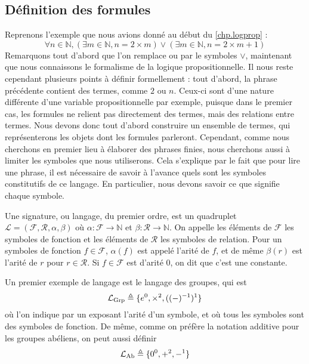 \subsection{Définition des formules}

Reprenons l'exemple que nous avions donné au début du \cref{chp.logprop} :
\[\forall n \in \mathbb N, (\exists m \in \mathbb N, n = 2\times m) \lor
(\exists m \in \mathbb N, n = 2 \times m + 1)\]
Remarquons tout d'abord que l'on remplace \og ou\fg{} par le symboles $\lor$,
maintenant que nous connaissons le formalisme de la logique propositionnelle.
Il nous reste cependant plusieurs points à définir formellement : tout d'abord,
la phrase précédente contient des termes, comme $2$ ou $n$. Ceux-ci sont d'une
nature différente d'une variable propositionnelle par exemple, puisque dans le
premier cas, les formules ne relient pas directement des termes, mais des
relations entre termes. Nous devons donc tout d'abord construire un ensemble de
termes, qui représenterons les objets dont les formules parleront. Cependant,
comme nous cherchons en premier lieu à élaborer des phrases finies, nous
cherchons aussi à limiter les symboles que nous utiliserons. Cela s'explique par
le fait que pour lire une phrase, il est nécessaire de savoir à l'avance quels
sont les symboles constitutifs de ce langage. En particulier, nous devons savoir
ce que signifie chaque symbole.

\begin{definition}[Signature]
  Une signature, ou langage, du premier ordre, est un quadruplet $\mathcal L =
  (\mathcal F,\mathcal R, \alpha,\beta)$ où $\alpha : \mathcal F \to \mathbb N$
  et $\beta : \mathcal R \to \mathbb N$. On appelle les éléments de $\mathcal F$
  les symboles de fonction et les éléments de $\mathcal R$ les symboles de
  relation. Pour un symboles de fonction $f\in\mathcal F$, $\alpha(f)$ est appelé
  l'arité de $f$, et de même $\beta(r)$ est l'arité de $r$ pour $r\in\mathcal R$.
  Si $f\in\mathcal F$ est d'arité $0$, on dit que c'est une constante.
\end{definition}

\begin{example}
  Un premier exemple de langage est le langage des groupes, qui est
  \[\mathcal L_{\mathrm{Grp}} \triangleq \{e^0,\times^2,((-)^{-1})^1\}\]
  où l'on indique par un exposant l'arité d'un symbole, et où tous les symboles
  sont des symboles de fonction. De même, comme on préfère la notation additive
  pour les groupes abéliens, on peut aussi définir
  \[\mathcal L_{\mathrm{Ab}} \triangleq \{0^0,+^2,-^1\}\]
\end{example}

